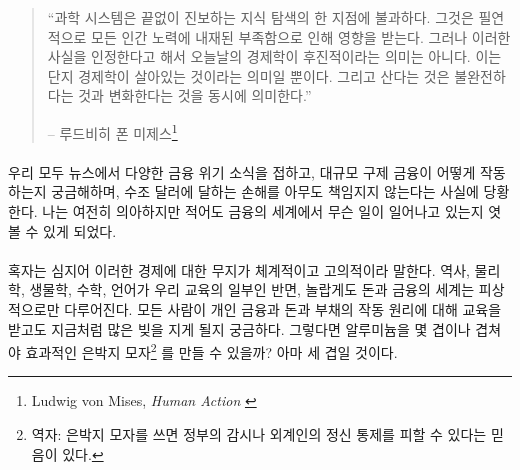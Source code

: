 \begin{quotation}\begin{samepage}
		\enquote{과학 시스템은 끝없이 진보하는 지식 탐색의 한 지점에 불과하다. 
			그것은 필연적으로 모든 인간 노력에 내재된 부족함으로 인해 영향을 받는다.
			그러나 이러한 사실을 인정한다고 해서 오늘날의 경제학이 후진적이라는 의미는 아니다.
			이는 단지 경제학이 살아있는 것이라는 의미일 뿐이다. 
			그리고 산다는 것은 불완전하다는 것과 변화한다는 것을 동시에 의미한다.}
		\begin{flushright} -- 루드비히 폰 미제스\footnote{Ludwig von Mises, \textit{Human Action}
				\cite{human-action}}
\end{flushright}\end{samepage}\end{quotation}


\paragraph{}
우리 모두 뉴스에서 다양한 금융 위기 소식을 접하고, 대규모 구제 금융이 어떻게 작동하는지 궁금해하며, 
수조 달러에 달하는 손해를 아무도 책임지지 않는다는 사실에 당황한다.
나는 여전히 의아하지만 적어도 금융의 세계에서 무슨 일이 일어나고 있는지 엿볼 수 있게 되었다.

\paragraph{}
혹자는 심지어 이러한 경제에 대한 무지가 체계적이고 고의적이라 말한다.
역사, 물리학, 생물학, 수학, 언어가 우리 교육의 일부인 반면, 
놀랍게도 돈과 금융의 세계는 피상적으로만 다루어진다. 
모든 사람이 개인 금융과 돈과 부채의 작동 원리에 대해 교육을 받고도 지금처럼 많은 빚을 지게 될지 궁금하다.
그렇다면 알루미늄을 몇 겹이나 겹쳐야 효과적인 은박지 모자\footnote{역자: 은박지 모자를 쓰면 정부의 감시나 외계인의 정신 통제를 피할 수 있다는 믿음이 있다.}
를 만들 수 있을까? 아마 세 겹일 것이다.

